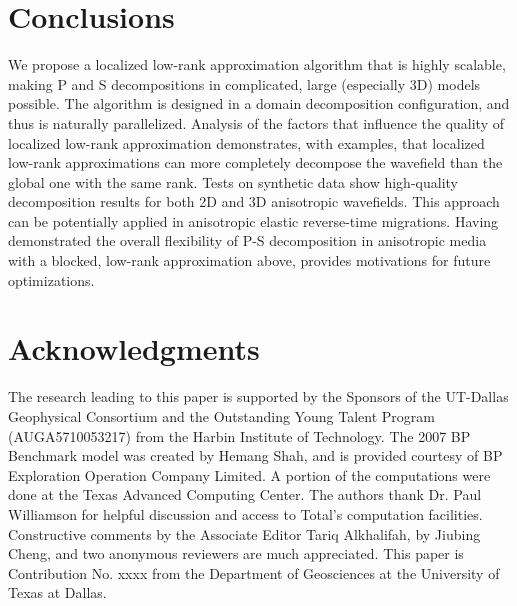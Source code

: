 \documentclass[manuscript,ulem,graphix,revised]{geophysics}
\begin{document}
\section{Conclusions}
\indent\indent
We propose a localized low-rank approximation algorithm that is highly scalable, making P and S decompositions in complicated, large (especially 3D) models possible.
The algorithm is designed in a domain decomposition configuration, and thus is naturally parallelized. Analysis of the factors that influence the quality of localized low-rank approximation demonstrates, with examples, that localized low-rank approximations can more completely decompose the wavefield than the global one with the same rank. 
Tests on synthetic data show high-quality decomposition results for both 2D and 3D anisotropic wavefields.
This approach can be potentially applied in anisotropic elastic reverse-time migrations. Having demonstrated the overall flexibility of P-S decomposition in anisotropic media with a blocked, low-rank approximation above, provides motivations for future optimizations.


\section{Acknowledgments}
\indent\indent
The research leading to this paper is supported by the Sponsors of the
UT-Dallas Geophysical Consortium and the Outstanding Young Talent Program (AUGA5710053217) from the Harbin Institute of Technology. The 2007 BP Benchmark model was created by Hemang Shah, and is provided courtesy of BP Exploration Operation Company Limited. A portion of the computations were done at the Texas Advanced Computing Center. The authors thank Dr. Paul Williamson for helpful discussion and access to Total's computation facilities. Constructive comments by the Associate Editor Tariq Alkhalifah, by Jiubing Cheng, and two anonymous reviewers are much appreciated. This paper is Contribution No. xxxx from the Department of Geosciences at the University of Texas at Dallas. 




%


%

\newpage


\end{document}
